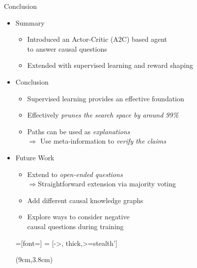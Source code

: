 \documentclass[table]{beamer}
\begin{document}
\begin{frame}{Conclusion}
\begin{itemize}
    \item Summary
    \begin{itemize}
        \item Introduced an Actor-Critic (A2C) based agent\\to answer causal questions
        \item Extended with supervised learning and reward shaping
    \end{itemize}
    \item<2-> Conclusion
    \begin{itemize}
        \item Supervised learning provides an effective foundation
        \item Effectively \emph{prunes the search space by around 99\%}
        \item Paths can be used as \emph{explanations}\\$\Rightarrow$ Use meta-information to \emph{verify the claims}
    \end{itemize}
    \item<3-> Future Work
    \begin{itemize}
        \item Extend to \emph{open-ended questions}\\$\Rightarrow$Straightforward extension via majority voting
        \item Add different causal knowledge graphs
        \item Explore ways to consider negative\\causal questions during training
    \end{itemize}

  \tikzset{>=triangle 45}
  \tikzset{every picture/.style=thick}
  =[font=\small]
     = [->, thick,>=stealth']

  \begin{textblock*}{5cm}(9cm,3.8cm) 
\end{textblock*}
\end{itemize}
\end{frame}
\end{document}
